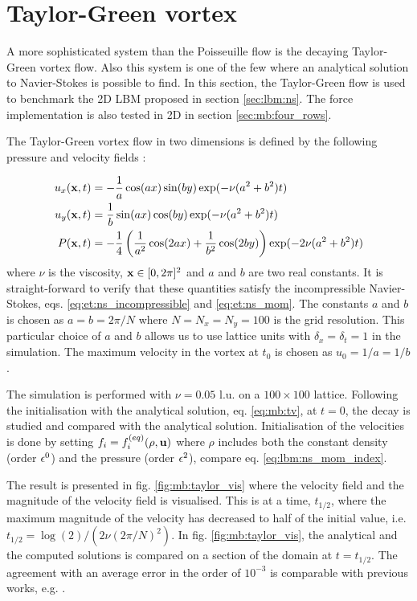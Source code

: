 \section{Taylor-Green vortex}
A more sophisticated system than the Poisseuille flow is the decaying
Taylor-Green vortex flow. Also this system is one of the few where an
analytical solution to Navier-Stokes is possible to find. In this
section, the Taylor-Green flow is used to benchmark the 2D LBM
proposed in section \ref{sec:lbm:ns}. The force implementation is also
tested in 2D in section \ref{sec:mb:four_rows}. 

The Taylor-Green vortex flow in two dimensions is defined by the
following pressure and velocity fields \cite{junk-asym}:

\begin{equation}\label{eq:mb:tv}
\begin{aligned}
u_x(\mathbf{x}, t) &= -\frac{1}{a}\cos(ax)\sin(by)\exp(-\nu(a^2 +
b^2)t)\\ 
u_y(\mathbf{x}, t) &= \frac{1}{b}\sin(ax)\cos(by)\exp(-\nu(a^2 +
b^2)t)\\ 
P(\mathbf{x}, t) &= -\frac{1}{4} \left( \frac{1}{a^2}\cos(2ax) +
\frac{1}{b^2}\cos(2by)\right) \exp(-2\nu(a^2 + b^2)t)
\end{aligned}
\end{equation}
where $\nu$ is the viscosity, $\mathbf{x}\in[0, 2\pi]^2$ and $a$ and $b$ are
two real constants. It is straight-forward to verify that these
quantities satisfy the incompressible Navier-Stokes,
eqs. \eqref{eq:et:ns_incompressible} and \eqref{eq:et:ns_mom}. The
constants $a$ and $b$ is chosen as $a = b = 2\pi/N$ where $N = N_x =
N_y = 100$ is the grid resolution. This particular choice of $a$ and
$b$ allows us to use lattice units with $\delta_x = \delta_t = 1$ in
the simulation. The maximum velocity in the vortex at $t_0$ is chosen
as $u_0 = 1/a = 1/b$.

The simulation is performed with $\nu = 0.05$ l.u. on a $100\times100$
lattice. Following the initialisation with the analytical solution,
eq. \eqref{eq:mb:tv}, at $t = 0$, the decay is studied and compared
with the analytical solution. Initialisation of the velocities is done
by setting $f_i = f_i^{(eq)}(\rho, \mathbf{u})$ where $\rho$ includes both the
constant density (order $\epsilon^0$) and the pressure (order $\epsilon^2$),
compare eq. \eqref{eq:lbm:ns_mom_index}.

The result is presented in fig. \ref{fig:mb:taylor_vis} where the
velocity field and the magnitude of the velocity field is
visualised. This is at a time, $t_{1/2}$, where the maximum magnitude
of the velocity has decreased to half of the initial value,
i.e. $t_{1/2} = \log(2)/(2\nu(2\pi/N)^2)$. In
fig. \ref{fig:mb:taylor_vis}, the analytical and the computed
solutions is compared on a section of the domain at $t = t_{1/2}$. The
agreement with an average error in the order of $10^{-3}$ is
comparable with previous works, e.g. \cite{junk-asym}.


